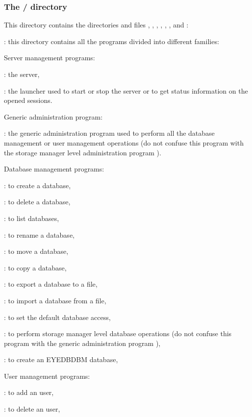 \subsubsection{The \tdir/ directory}
This directory contains the directories and files
, , , , ,
,  and :
\bi
\item {}: this directory contains all the \eyedb programs
divided into different families:
\be
\item Server management programs:
\bi
\item {}: the \eyedb server,
\item {}: the \eyedb launcher used to start or stop
the server or to get status information on the opened sessions.
\ei
\item Generic administration program:
\bi
\item {}: the generic administration program used to perform
all the database management or user management operations (do not confuse
this program with the storage manager level administration program
).
\ei
\item Database management programs:
\bi
\item {}: to create a database,
\item {}: to delete a database,
\item {}: to list databases,
\item {}: to rename a database,
\item {}: to move a database,
\item {}: to copy a database,
\item {}: to export a database to a file,
\item {}: to import a database from a file,
\item {}: to set the default database access,
\item {}: to perform storage manager level database operations
(do not confuse this program with the generic administration program ),
\item {}: to create an EYEDBDBM database,
\ei
\item User management programs:
\bi
\item {}: to add an \eyedb user,
\item {}: to delete an \eyedb user,
